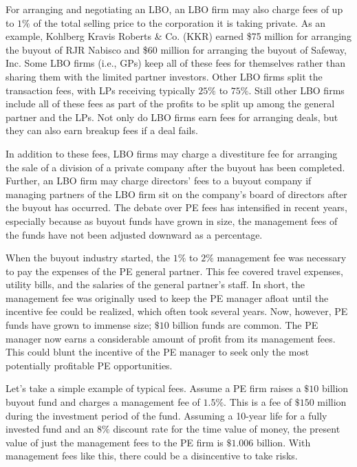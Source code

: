 \documentclass[11pt]{article}
\begin{document}
For arranging and negotiating an LBO, an LBO firm may also charge fees of up to $1 \%$ of the total selling price to the corporation it is taking private. As an example, Kohlberg Kravis Roberts \& Co. (KKR) earned \$75 million for arranging the buyout of RJR Nabisco and \$60 million for arranging the buyout of Safeway, Inc. Some LBO firms (i.e., GPs) keep all of these fees for themselves rather than sharing them with the limited partner investors. Other LBO firms split the transaction fees, with LPs receiving typically $25 \%$ to $75 \%$. Still other LBO firms include all of these fees as part of the profits to be split up among the general partner and the LPs. Not only do LBO firms earn fees for arranging deals, but they can also earn breakup fees if a deal fails.

In addition to these fees, LBO firms may charge a divestiture fee for arranging the sale of a division of a private company after the buyout has been completed. Further, an LBO firm may charge directors' fees to a buyout company if managing partners of the LBO firm sit on the company's board of directors after the buyout has occurred. The debate over PE fees has intensified in recent years, especially because as buyout funds have grown in size, the management fees of the funds have not been adjusted downward as a percentage.

When the buyout industry started, the $1 \%$ to $2 \%$ management fee was necessary to pay the expenses of the PE general partner. This fee covered travel expenses, utility bills, and the salaries of the general partner's staff. In short, the management fee was originally used to keep the PE manager afloat until the incentive fee could be realized, which often took several years. Now, however, PE funds have grown to immense size; $\$ 10$ billion funds are common. The PE manager now earns a considerable amount of profit from its management fees. This could blunt the incentive of the PE manager to seek only the most potentially profitable PE opportunities.

Let's take a simple example of typical fees. Assume a PE firm raises a $\$ 10$ billion buyout fund and charges a management fee of $1.5 \%$. This is a fee of $\$ 150$ million during the investment period of the fund. Assuming a 10-year life for a fully invested fund and an $8 \%$ discount rate for the time value of money, the present value of just the management fees to the PE firm is $\$ 1.006$ billion. With management fees like this, there could be a disincentive to take risks.
\end{document}
